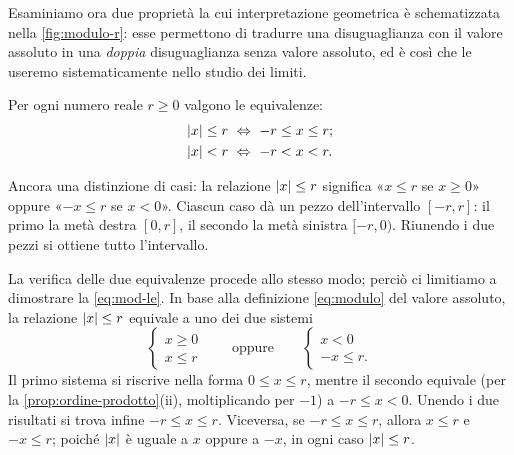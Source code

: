 Esaminiamo ora due proprietà la cui interpretazione geometrica è schematizzata nella
\cref{fig:modulo-r}: esse permettono di tradurre una disuguaglianza con il valore
assoluto in una \emph{doppia} disuguaglianza senza valore assoluto, ed è così che le
useremo sistematicamente nello studio dei limiti.

\begin{proposizione}\label{prop:modulo-r}
Per ogni numero reale $r\ge0$ valgono le equivalenze:
\begin{align}
  \lvert x\rvert\le r &\ \Leftrightarrow\ -r\le x\le r; \label{eq:mod-le}\\
  \lvert x\rvert<r    &\ \Leftrightarrow\ -r<x<r. \label{eq:mod-lt}
\end{align}
\end{proposizione}

\begin{schema}
\end{schema}

\begin{strategia}
Ancora una distinzione di casi: la relazione $\lvert x\rvert\le r$ significa «$x\le r$ se
$x\ge0$» oppure «$-x\le r$ se $x<0$». Ciascun caso dà un pezzo dell'intervallo
$[-r,r]$: il primo la metà destra $[0,r]$, il secondo la metà sinistra $[-r,0)$.
Riunendo i due pezzi si ottiene tutto l'intervallo.
\end{strategia}

\begin{dimostrazione}
La verifica delle due equivalenze procede allo stesso modo; perciò ci limitiamo a
dimostrare la \eqref{eq:mod-le}. In base alla definizione \eqref{eq:modulo} del valore
assoluto, la relazione $\lvert x\rvert\le r$ equivale a uno dei due sistemi
\begin{equation}\label{eq:mod-sistemi}
  \begin{cases} x\ge0\\ x\le r\end{cases} \qquad\text{oppure}\qquad
  \begin{cases} x<0\\ -x\le r.\end{cases}
\end{equation}
Il primo sistema si riscrive nella forma $0\le x\le r$, mentre il secondo equivale (per
la \cref{prop:ordine-prodotto}(ii), moltiplicando per $-1$) a $-r\le x<0$. Unendo i due
risultati si trova infine $-r\le x\le r$. Viceversa, se $-r\le x\le r$, allora
$x\le r$ e $-x\le r$; poiché $\lvert x\rvert$ è uguale a $x$ oppure a $-x$, in ogni caso
$\lvert x\rvert\le r$.
\end{dimostrazione}

